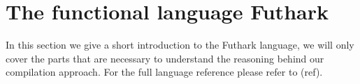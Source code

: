 \documentclass[11pt]{article}
\begin{document}







 





\section{The functional language Futhark}

In this section we give a short introduction to the Futhark language, we will only cover the parts that are necessary to understand
the reasoning behind our compilation approach. For the full language reference please refer to (ref).
\end{document}
